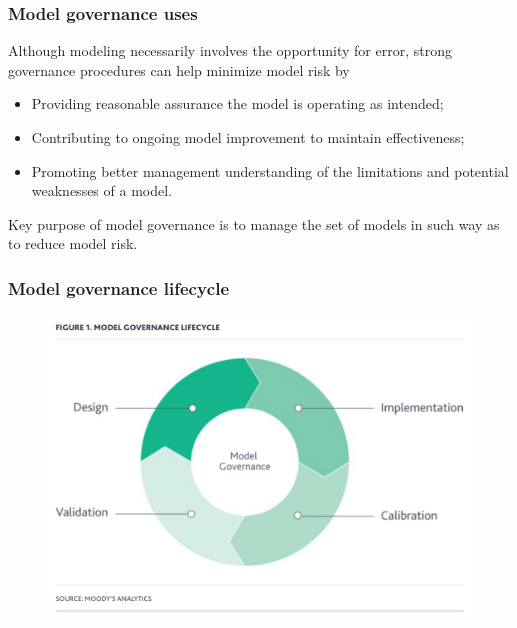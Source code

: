 \documentclass[11pt]{beamer}
\begin{document}
\begin{frame}
\frametitle{Model governance uses}
Although modeling necessarily involves the opportunity for error, strong governance procedures can help minimize model risk by
\begin{itemize}
	\item Providing reasonable assurance the model is operating as intended;
	\item Contributing to ongoing model improvement to maintain effectiveness;
	\item Promoting better management understanding of the limitations and potential weaknesses of a model.
\end{itemize}
Key purpose of model governance is to manage the set of models in such way as to reduce model risk.
\end{frame}


\begin{frame}
\frametitle{Model governance lifecycle}
\begin{figure}[h]
\centering
\includegraphics[scale=.3]{images/model_gov_lifecycle}
\end{figure}
\end{frame}
\end{document}
